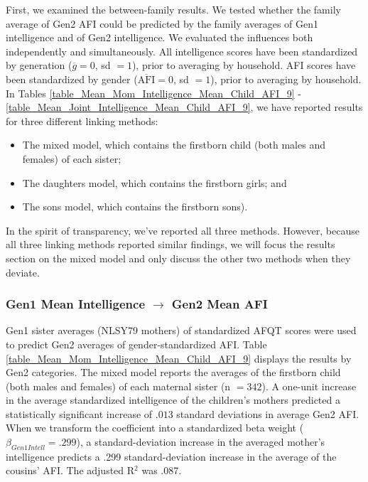 First, we examined the between-family results. We tested whether the family average of Gen2 AFI could be predicted by the family averages of Gen1 intelligence and of Gen2 intelligence. We evaluated the influences both independently and simultaneously. All intelligence scores have been standardized by generation ($\overline{g} = 0$, sd $= 1$), prior to averaging by household. AFI scores have been standardized by gender ($\overline{\mathrm{AFI}} = 0$, sd $= 1$), prior to averaging by household. In Tables \ref{table_Mean_Mom_Intelligence_Mean_Child_AFI_9} - \ref{table_Mean_Joint_Intelligence_Mean_Child_AFI_9}, we have reported results for three different linking methods:
\begin{itemize} 
\item The mixed model, which contains the firstborn child (both males and females) of each sister;
\item The daughters model, which contains the firstborn girls; and 
\item The sons model, which contains the firstborn sons).\end{itemize}
In the spirit of transparency, we've reported all three methods. However, because all three linking methods reported similar findings, we will focus the results section on the mixed model and only discuss the other two methods when they deviate.
\subsubsection{Gen1 Mean Intelligence $\rightarrow$ Gen2 Mean AFI} Gen1 sister averages (NLSY79 mothers) of standardized AFQT scores were used to predict Gen2 averages of gender-standardized AFI. Table \ref{table_Mean_Mom_Intelligence_Mean_Child_AFI_9} displays the results by Gen2 categories. The mixed model reports the averages of the firstborn child (both males and females) of each maternal sister (n $= 342$). A one-unit increase in the average standardized intelligence of the children's mothers predicted a statistically significant increase of $.013$ standard deviations in average Gen2 AFI. When we transform the coefficient into a standardized beta weight ($\beta_{Gen1 Intell} = .299$), a standard-deviation increase in the averaged mother's intelligence predicts a .299 standard-deviation increase in the average of the cousins' AFI. The adjusted R$^{2}$ was .087.

